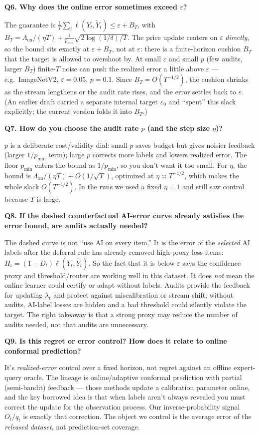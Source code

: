 \documentclass[11pt]{article}
\newcommand{\eps}{\varepsilon}
\newcommand{\tildeY}{\widetilde Y}
\newcommand{\qsection}[1]{%
  \par\vspace{0.7\baselineskip}%
  {\large\bfseries\color{blue!45!black}#1}\par
  \vspace{0.2\baselineskip}}
\begin{document}
\qsection{Q6. Why does the online error sometimes exceed $\eps$?}
The guarantee is $\frac1T\sum_t\ell(Y_t,\tildeY_t)\le\eps+B_T$, with
$B_T=\Lambda_{\mathrm{on}}/(\eta T)+\tfrac1{p_{\min}}\sqrt{2\log(1/\delta)/T}$.
The price update centers on $\eps$ \emph{directly}, so the bound sits exactly at
$\eps+B_T$, not at $\eps$: there is a finite-horizon cushion $B_T$ that the
target is allowed to overshoot by. At small $\eps$ and small $p$ (few audits,
larger $B_T$) finite-$T$ noise can push the realized error a little above $\eps$
--- e.g.\ ImageNetV2, $\eps=0.05$, $p=0.1$. Since $B_T=O(T^{-1/2})$, the cushion
shrinks as the stream lengthens or the audit rate rises, and the error settles
back to $\eps$. (An earlier draft carried a separate internal target $\eps_0$ and
``spent'' this slack explicitly; the current version folds it into $B_T$.)

\qsection{Q7. How do you choose the audit rate $p$ (and the step size $\eta$)?}
$p$ is a deliberate cost/validity dial: small $p$ saves budget but gives noisier
feedback (larger $1/p_{\min}$ term); large $p$ corrects more labels and lowers
realized error. The floor $p_{\min}$ enters the bound as $1/p_{\min}$, so you
don't want it too small. For $\eta$, the bound is
$\Lambda_{\mathrm{on}}/(\eta T)+O(1/\sqrt T)$, optimized at
$\eta\asymp T^{-1/2}$, which makes the whole slack $O(T^{-1/2})$. In the runs we
used a fixed $\eta=1$ and still saw control because $T$ is large.

\qsection{Q8. If the dashed counterfactual AI-error curve already satisfies the error bound, are audits actually needed?}
The dashed curve is not ``use AI on every item.'' It is the error of the
\emph{selected} AI labels after the deferral rule has already removed
high-proxy-loss items: $H_t=(1-D_t)\ell(Y_t,\hat Y_t)$. So the fact that it is
below $\eps$ says the confidence proxy and threshold/router are working well in
this dataset. It does \emph{not} mean the online learner could certify or adapt
without labels. Audits provide the feedback for updating $\lambda_t$ and protect
against miscalibration or stream shift; without audits, AI-label losses are
hidden and a bad threshold could silently violate the target. The right takeaway
is that a strong proxy may reduce the number of audits needed, not that audits
are unnecessary.

\qsection{Q9. Is this regret or error control? How does it relate to online conformal prediction?}
It's \emph{realized-error} control over a fixed horizon, not regret against an
offline expert-query oracle. The lineage is online/adaptive conformal prediction
with partial (semi-bandit) feedback --- those methods update a calibration
parameter online, and the key borrowed idea is that when labels aren't always
revealed you must correct the update for the observation process. Our
inverse-probability signal $O_t/q_t$ is exactly that correction. The object we
control is the average error of the \emph{released dataset}, not prediction-set
coverage.
\end{document}

